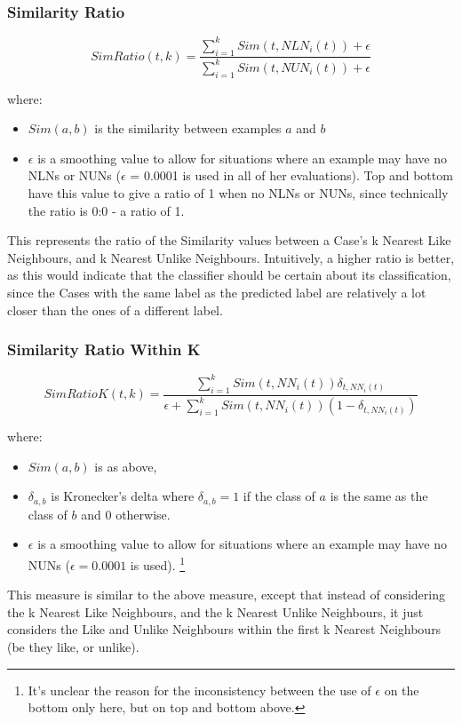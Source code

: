 \documentclass[a4paper,11pt]{report}
\begin{document}
\subsubsection{Similarity Ratio}
\[
SimRatio(t,k)=\frac{\sum_{i=1}^{k}Sim(t,NLN_{i}(t))+\epsilon}{\sum_{i=1}^{k}Sim(t,NUN_{i}(t))+\epsilon}
\]

where:
\begin{itemize}
	\item $Sim(a, b)$ is the similarity between examples $a$ and $b$ 
	\item $\epsilon$ is a smoothing value to allow for situations where an example may have no NLNs or NUNs ($\epsilon$ = 0.0001 is used in all of her evaluations). Top and bottom have this value to give a ratio of 1 when no NLNs or NUNs, since technically the ratio is 0:0 - a ratio of 1.
\end{itemize}

This represents the ratio of the Similarity values between a Case's k Nearest Like Neighbours, and k Nearest Unlike Neighbours. Intuitively, a higher ratio is better, as this would indicate that the classifier should be certain about its classification, since the Cases with the same label as the predicted label are relatively a lot closer than the ones of a different label.

\subsubsection{Similarity Ratio Within K}
\[
SimRatioK(t,k)=\frac{\sum_{i=1}^{k}Sim(t,NN_{i}(t))\delta_{t,NN_{i}(t)}}{\epsilon+\sum_{i=1}^{k}Sim(t,NN_{i}(t))(1-\delta_{t,NN_{i}(t)})}
\]

where:
\begin{itemize}
	\item $Sim(a, b)$ is as above, 
	\item $\delta_{a, b}$ is Kronecker's delta where $\delta_{a, b}=1$ if the class of $a$ is the same as the class of $b$ and $0$ otherwise. 
	\item $\epsilon$ is a smoothing value to allow for situations where an example may have no NUNs ($\epsilon = 0.0001$ is used). \footnote{It's unclear the reason for the inconsistency between the use of $\epsilon$ on the bottom only here, but on top and bottom above.}
\end{itemize}

This measure is similar to the above measure, except that instead of considering the k Nearest Like Neighbours, and the k Nearest Unlike Neighbours, it just considers the Like and Unlike Neighbours within the first k Nearest Neighbours (be they like, or unlike).
\end{document}
